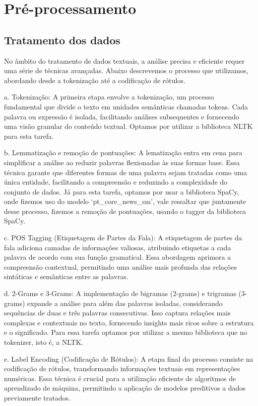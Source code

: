 \section{Pré-processamento}
\label{sec:pre-processing}

\subsection{Tratamento dos dados}

No âmbito do tratamento de dados textuais, a análise precisa e eficiente requer uma série de técnicas avançadas. Abaixo descrevemos o processo que  utilizamos, abordando desde a tokenização até a codificação de rótulos.

a. Tokenização:
A primeira etapa envolve a tokenização, um processo fundamental que divide o texto em unidades semânticas chamadas tokens. Cada palavra ou expressão é isolada, facilitando análises subsequentes e fornecendo uma visão granular do conteúdo textual. Optamos por utilizar a biblioteca NLTK para esta tarefa.

b. Lemmatização e remoção de pontuações:
A lematização entra em cena para simplificar a análise ao reduzir palavras flexionadas às suas formas base. Essa técnica garante que diferentes formas de uma palavra sejam tratadas como uma única entidade, facilitando a compreensão e reduzindo a complexidade do conjunto de dados. Já para esta tarefa, optamos por usar a biblioteca SpaCy, onde fizemos uso do modelo `pt\_core\_news\_sm', vale ressaltar que juntamente desse processo, fizemos a remoção de pontuações, usando o tagger da biblioteca SpaCy.

c. POS Tagging (Etiquetagem de Partes da Fala):
A etiquetagem de partes da fala adiciona camadas de informações valiosas, atribuindo etiquetas a cada palavra de acordo com sua função gramatical. Essa abordagem aprimora a compreensão contextual, permitindo uma análise mais profunda das relações sintáticas e semânticas entre as palavras.

d. 2-Grams e 3-Grams:
A implementação de bigramas (2-grams) e trigramas (3-grams) expande a análise para além das palavras isoladas, considerando sequências de duas e três palavras consecutivas. Isso captura relações mais complexas e contextuais no texto, fornecendo insights mais ricos sobre a estrutura e o significado. Para essa tarefa optamos por utilizar a mesmo biblioteca que no tokenizer, isto é, a NLTK.

e. Label Encoding (Codificação de Rótulos):
A etapa final do processo consiste na codificação de rótulos, transformando informações textuais em representações numéricas. Essa técnica é crucial para a utilização eficiente de algoritmos de aprendizado de máquina, permitindo a aplicação de modelos preditivos a dados previamente tratados.


